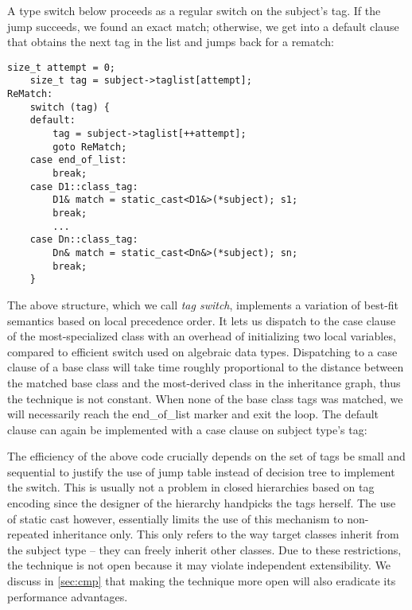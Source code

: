 A type switch below %
proceeds as 
a regular switch on the subject's tag. If the jump succeeds, we found an exact 
match; otherwise, we get into a default clause that obtains the next tag in the
list and jumps back %
for a rematch:

\begin{lstlisting}[keepspaces]
    size_t attempt = 0; 
    size_t tag = subject->taglist[attempt];
ReMatch:
    switch (tag) {
    default:
        tag = subject->taglist[++attempt];
        goto ReMatch;
    case end_of_list: 
        break;
    case D1::class_tag: 
        D1& match = static_cast<D1&>(*subject); s1;
        break;
        ...
    case Dn::class_tag: 
        Dn& match = static_cast<Dn&>(*subject); sn;
        break;
    }
\end{lstlisting}

\noindent
The above structure, which we call \emph{tag switch}, implements a variation of 
best-fit semantics based on local precedence order. It lets us dispatch to the case 
clause of the most-specialized class with an overhead of initializing two 
local variables, compared to efficient switch used on algebraic data types. 
Dispatching to a case clause of a base class will take time roughly proportional 
to the distance between the matched base class and the most-derived class in the 
inheritance graph, thus the technique is not constant. When none of the base 
class tags was matched, we will necessarily reach the end\_of\_list marker %
and exit the loop. %
The default clause %
can again be implemented with a case clause on subject type's tag: 

The efficiency of the above code crucially depends on the set of tags 
be small and sequential to justify the use of jump table instead of 
decision tree to implement the switch. This is usually not a problem in closed 
hierarchies based on tag encoding since the designer of the hierarchy handpicks 
the tags herself. The use of static cast %
however, essentially limits the use of 
this mechanism to non-repeated inheritance only. This only refers to the way target 
classes inherit from the subject type -- they can freely inherit other classes. 
Due to these restrictions, the technique is not open because it may  
violate independent extensibility. We discuss in \textsection\ref{sec:cmp} that 
making the technique more open will also eradicate its performance advantages.